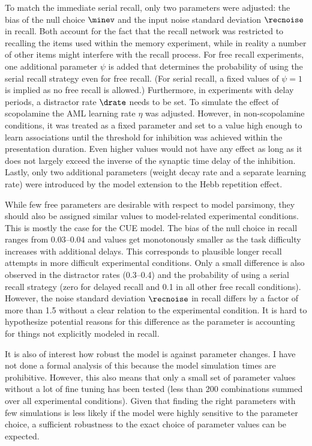To match the immediate serial recall, only two parameters were adjusted: the bias of the null choice $\minev$ and the input noise standard deviation $\recnoise$ in recall.
Both account for the fact that the recall network was restricted to recalling the items used within the memory experiment, while in reality a number of other items might interfere with the recall process.
For free recall experiments, one additional parameter $\psi$ is added that determines the probability of using the serial recall strategy even for free recall.
(For serial recall, a fixed values of $\psi = 1$ is implied as no free recall is allowed.)
Furthermore, in experiments with delay periods, a distractor rate $\drate$ needs to be set.
To simulate the effect of scopolamine the AML learning rate $\eta$ was adjusted.
However, in non-scopolamine conditions, it was treated as a fixed parameter and set to a value high enough to learn associations until the threshold for inhibition was achieved within the presentation duration.
Even higher values would not have any effect as long as it does not largely exceed the inverse of the synaptic time delay of the inhibition.
Lastly, only two additional parameters (weight decay rate and a separate learning rate) were introduced by the model extension to the Hebb repetition effect.

While few free parameters are desirable with respect to model parsimony, they should also be assigned similar values to model-related experimental conditions.
This is mostly the case for the CUE model.
The bias of the null choice in recall ranges from \numrange{0.03}{0.04} and values get monotonously smaller as the task difficulty increases with additional delays.
This corresponds to plausible longer recall attempts in more difficult experimental conditions.
Only a small difference is also observed in the distractor rates (\numrange{0.3}{0.4}) and the probability of using a serial recall strategy (zero for delayed recall and \num{0.1} in all other free recall conditions).
However, the noise standard deviation $\recnoise$ in recall differs by a factor of more than \num{1.5} without a clear relation to the experimental condition.
It is hard to hypothesize potential reasons for this difference as the parameter is accounting for things not explicitly modeled in recall.

It is also of interest how robust the model is against parameter changes.
I have not done a formal analysis of this because the model simulation times are prohibitive.
However, this also means that only a small set of parameter values without a lot of fine tuning has been tested (less than \num{200} combinations summed over all experimental conditions).
Given that finding the right parameters with few simulations is less likely if the model were highly sensitive to the parameter choice, a sufficient robustness to the exact choice of parameter values can be expected.

